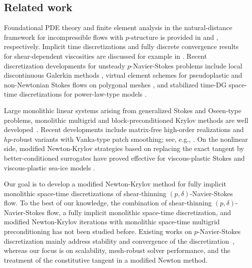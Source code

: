 \documentclass[DIV=16]{scrartcl}
\newcommand{\reg}{\delta}
\newcommand{\pn}{p}
\begin{document}
\subsection{Related work}
Foundational PDE theory and finite element analysis in the natural-distance
framework for incompressible flows with $\pn$-structure is
provided in \cite{MalekNecasRokytaRuzicka1996,DieningRuzickaWolf2010Weak}
and \cite{BarrettLiu1994Quasinorm,BelenkiBerselliDieningRuzicka2012pStokes}, respectively.
Implicit time discretizations and fully discrete convergence results for
shear-dependent viscosities are discussed for example in
\cite{ProhlRuzicka2001FullyImplicit,BerselliKaltenbach2025Convergence}. Recent discretization developments for unsteady $\pn$-Navier-Stokes problems
include local discontinuous Galerkin methods
\cite{KaltenbachRuzicka2023LDGpNS,KaltenbachRuzicka2023PartII,KaltenbachRuzicka2024PartIII},
virtual element schemes for pseudoplastic and non-Newtonian Stokes flows on
polygonal meshes \cite{AntoniettiEtAl2024VEMNonNewtonian}, and stabilized
time-DG space-time discretizations for power-law-type models
\cite{Toulopoulos2023DGPowerLaw}.

Large monolithic linear systems arising from generalized Stokes and
Oseen-type problems, monolithic multigrid and block-preconditioned Krylov
methods are well developed~\cite{drzisga_stencil_2020,schussnig_robust_2021,kohlTextbookEfficiencyMassively2022,abu-labdeh_monolithic_2023,jodlbauerMatrixfreeMonolithicMultigrid2024,prietosaavedraMatrixFreeStabilizedSolver2024,rafiei2025improvedmonolithicmultigridmethods,voroninMonolithicMultigridPreconditioners2024}. Recent developments include matrix-free high-order realizations and
$hp$-robust variants with Vanka-type patch smoothing; see, e.g.,
\cite{MargenbergMunchBause2025hpMGStokes,MargenbergBause2026MonolithicSTMG}.
On the nonlinear side, modified Newton-Krylov strategies based on replacing the
exact tangent by better-conditioned surrogates have proved effective for
viscous-plastic Stokes and viscous-plastic sea-ice models
\cite{RudiShihStadler2020AdvancedNewton,ShihMehlmannLoschStadler2023PrimalDualNewton}.

Our goal is to develop a modified Newton-Krylov method for fully implicit
monolithic space-time discretizations of shear-thinning
$(\pn,\reg)$-Navier-Stokes flow. To the best of our knowledge, the
combination of shear-thinning $(\pn,\reg)$-Navier-Stokes flow, a fully
implicit monolithic space-time discretization, and modified Newton-Krylov
iterations with monolithic space-time multigrid preconditioning has not been
studied before. Existing works on $\pn$-Navier-Stokes discretization mainly
address stability and convergence of the discretization~\cite{KaltenbachRuzicka2023LDGpNS,KaltenbachRuzicka2023PartII,KaltenbachRuzicka2024PartIII,Toulopoulos2023DGPowerLaw},
whereas our focus is on scalability, mesh-robust solver performance, and the
treatment of the constitutive tangent in a modified Newton method.
\end{document}
